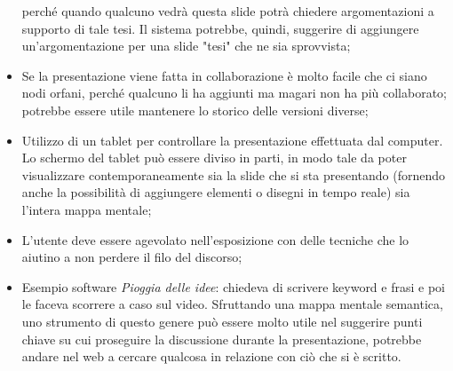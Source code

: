 \begin{itemize}
perché quando qualcuno vedrà questa slide potrà chiedere argomentazioni a supporto di tale tesi.
Il sistema potrebbe, quindi, suggerire di aggiungere un'argomentazione per una slide "tesi" che ne sia sprovvista;
\item Se la presentazione viene fatta in collaborazione è molto facile che ci siano nodi orfani, perché qualcuno li ha aggiunti ma magari non ha più collaborato; potrebbe essere utile mantenere lo storico delle versioni diverse;
\item Utilizzo di un tablet per controllare la presentazione effettuata dal computer.
Lo schermo del tablet può essere diviso in parti, in modo tale da poter visualizzare contemporaneamente sia la slide che si sta presentando (fornendo anche la possibilità di aggiungere elementi o disegni in tempo reale) sia l'intera mappa mentale;
\item L'utente deve essere agevolato nell'esposizione con delle tecniche che lo aiutino a non perdere il filo del discorso;
\item Esempio software \textit{Pioggia delle idee}: chiedeva di scrivere keyword e frasi e poi le faceva scorrere a caso sul video.
Sfruttando una mappa mentale semantica, uno strumento di questo genere può essere molto utile nel suggerire punti chiave su cui proseguire la discussione durante la presentazione, potrebbe andare nel web a cercare qualcosa in relazione con ciò che si è scritto.

\end{itemize}
